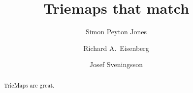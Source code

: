 \documentclass[format=sigplan]{acmart}
\theoremstyle{theorem}
\theoremstyle{definition}
\theoremstyle{remark}
\begin{document}
\newcommand{\simon}[1]{{\bf SLPJ}: #1 {\bf End SLPJ}}


\title%
{Triemaps that match}         %



\author{Simon Peyton Jones}

\author{Richard A.~Eisenberg}

\author{Josef Sveningsson}

\begin{abstract}
TrieMaps are great.
\end{abstract}

\maketitle
\end{document}
